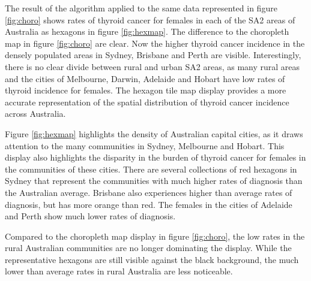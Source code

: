 The result of the algorithm applied to the same data represented in
figure \ref{fig:choro} shows rates of thyroid cancer for females in each
of the SA2 areas of Australia as hexagons in figure \ref{fig:hexmap}.
The difference to the choropleth map in figure \ref{fig:choro} are
clear. Now the higher thyroid cancer incidence in the densely populated
areas in Sydney, Brisbane and Perth are visible. Interestingly, there is
no clear divide between rural and urban SA2 areas, as many rural areas
and the cities of Melbourne, Darwin, Adelaide and Hobart have low rates
of thyroid incidence for females. The hexagon tile map display provides
a more accurate representation of the spatial distribution of thyroid
cancer incidence across Australia.

Figure \ref{fig:hexmap} highlights the density of Australian capital
cities, as it draws attention to the many communities in Sydney,
Melbourne and Hobart. This display also highlights the disparity in the
burden of thyroid cancer for females in the communities of these cities.
There are several collections of red hexagons in Sydney that represent
the communities with much higher rates of diagnosis than the Australian
average. Brisbane also experiences higher than average rates of
diagnosis, but has more orange than red. The females in the cities of
Adelaide and Perth show much lower rates of diagnosis.

Compared to the choropleth map display in figure \ref{fig:choro}, the
low rates in the rural Australian communities are no longer dominating
the display. While the representative hexagons are still visible against
the black background, the much lower than average rates in rural
Australia are less noticeable.

